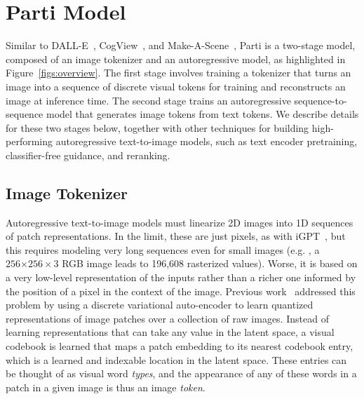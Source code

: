 \section{Parti Model} Similar to DALL-E~\cite{ramesh2021zero}, CogView~\cite{ding2021cogview}, and Make-A-Scene~\cite{gafni2022make}, Parti is a two-stage model, composed of an image tokenizer and an autoregressive model, as highlighted in Figure~\ref{figs:overview}. The first stage involves training a tokenizer that turns an image into a sequence of discrete visual tokens for training and reconstructs an image at inference time. The second stage trains an autoregressive sequence-to-sequence model that generates image tokens from text tokens. We describe details for these two stages below, together with other techniques for building high-performing autoregressive text-to-image models, such as text encoder pretraining, classifier-free guidance, and reranking.

\subsection{Image Tokenizer} \label{secs:tokenizer}
Autoregressive text-to-image models must linearize 2D images into 1D sequences of patch representations. In the limit, these are just pixels, as with iGPT~\cite{chen2020generative}, but this requires modeling very long sequences even for small images (e.g. , a \(256{\times256}\times3\) RGB image leads to 196,608 rasterized values). Worse, it is based on a very low-level representation of the inputs rather than a richer one informed by the position of a pixel in the context of the image. Previous work~\cite{van2017neural, ramesh2021zero, yu2021vector, gafni2022make} addressed this problem by using a discrete variational auto-encoder to learn quantized representations of image patches over a collection of raw images. Instead of learning representations that can take any value in the latent space, a visual codebook is learned that maps a patch embedding to its nearest codebook entry, which is a learned and indexable location in the latent space. These entries can be thought of as visual word \textit{types}, and the appearance of any of these words in a patch in a given image is thus an image \textit{token}.

